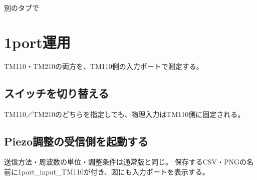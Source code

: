 \documentclass[a4paper,11pt]{ltjsarticle}
\begin{document}
別のタブで


\begin{command}


\end{command}

\section{1port運用}

TM110・TM210の両方を、TM110側の入力ポートで測定する。

\subsection{スイッチを切り替える}

\begin{command}
\end{command}

TM110／TM210のどちらを指定しても、物理入力はTM110側に固定される。

\subsection{Piezo調整の受信側を起動する}

\begin{command}
\end{command}

送信方法・周波数の単位・調整条件は通常版と同じ。
保存するCSV・PNGの名前に1port\_input\_TM110が付き、図にも入力ポートを表示する。
\end{document}
